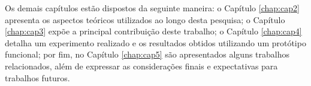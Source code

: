 %
%
%
%


Os demais capítulos estão dispostos da seguinte maneira: o Capítulo \ref{chap:cap2} apresenta os aspectos teóricos utilizados ao longo desta pesquisa; o Capítulo \ref{chap:cap3} expõe a principal contribuição deste trabalho; o Capítulo \ref{chap:cap4} detalha um experimento realizado e os resultados obtidos utilizando um protótipo funcional; por fim, no Capítulo \ref{chap:cap5} são apresentados alguns trabalhos relacionados, além de expressar as considerações finais e expectativas para trabalhos futuros.